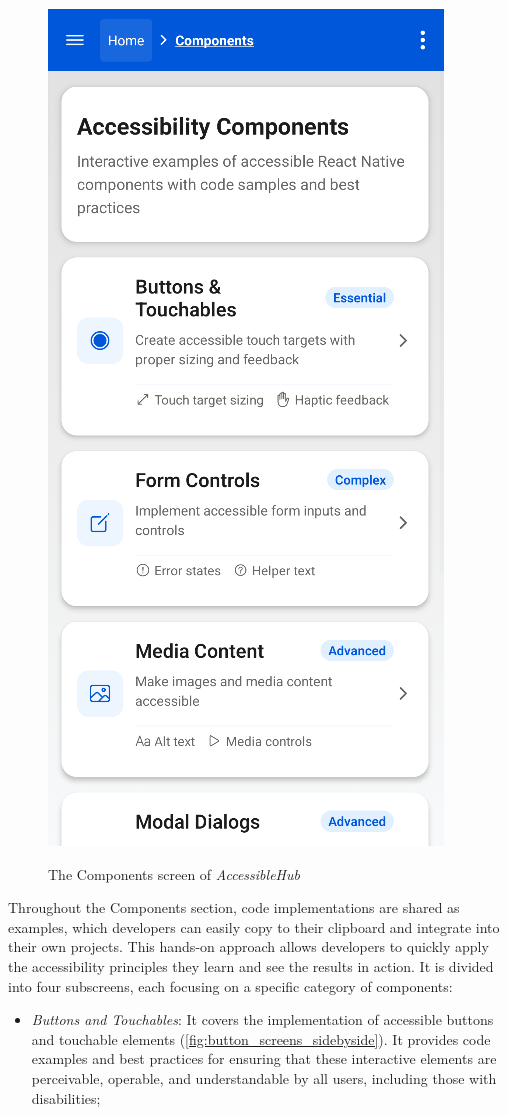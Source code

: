\begin{enumerate}
    \begin{figure}[ht]
    \centering
    \includegraphics[width=0.4\linewidth, alt={Screenshot of the Components screen of AccessibleHub}]{img/components.png}
    \caption{The Components screen of \textit{AccessibleHub}}\label{fig:components}
    \end{figure}
    
    \pagebreak
    
    Throughout the Components section, code implementations are shared as examples, which developers can easily copy to their clipboard and integrate into their own projects. This hands-on approach allows developers to quickly apply the accessibility principles they learn and see the results in action.
    It is divided into four subscreens, each focusing on a specific category of components:

    \begin{itemize}
        \item \textit{Buttons and Touchables}: It covers the implementation of accessible buttons and touchable elements (\ref{fig:button_screens_sidebyside}). It provides code examples and best practices for ensuring that these interactive elements are perceivable, operable, and understandable by all users, including those with disabilities;


\end{itemize}
\end{enumerate}
